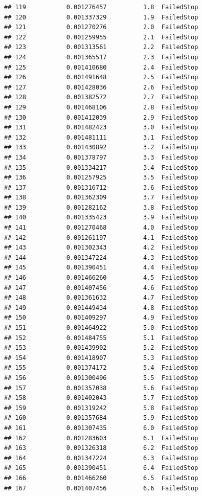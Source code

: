 \documentclass[
]{article}
\begin{document}
\begin{verbatim}
## 119           0.001276457          1.8  FailedStop
## 120           0.001337329          1.9  FailedStop
## 121           0.001270276          2.0  FailedStop
## 122           0.001259955          2.1  FailedStop
## 123           0.001313561          2.2  FailedStop
## 124           0.001365517          2.3  FailedStop
## 125           0.001410680          2.4  FailedStop
## 126           0.001491648          2.5  FailedStop
## 127           0.001428036          2.6  FailedStop
## 128           0.001382572          2.7  FailedStop
## 129           0.001468106          2.8  FailedStop
## 130           0.001412039          2.9  FailedStop
## 131           0.001482423          3.0  FailedStop
## 132           0.001481111          3.1  FailedStop
## 133           0.001430892          3.2  FailedStop
## 134           0.001378797          3.3  FailedStop
## 135           0.001334217          3.4  FailedStop
## 136           0.001257925          3.5  FailedStop
## 137           0.001316712          3.6  FailedStop
## 138           0.001362309          3.7  FailedStop
## 139           0.001282162          3.8  FailedStop
## 140           0.001335423          3.9  FailedStop
## 141           0.001270468          4.0  FailedStop
## 142           0.001261197          4.1  FailedStop
## 143           0.001302343          4.2  FailedStop
## 144           0.001347224          4.3  FailedStop
## 145           0.001390451          4.4  FailedStop
## 146           0.001466260          4.5  FailedStop
## 147           0.001407456          4.6  FailedStop
## 148           0.001361632          4.7  FailedStop
## 149           0.001449434          4.8  FailedStop
## 150           0.001409297          4.9  FailedStop
## 151           0.001464922          5.0  FailedStop
## 152           0.001484755          5.1  FailedStop
## 153           0.001439902          5.2  FailedStop
## 154           0.001418907          5.3  FailedStop
## 155           0.001374172          5.4  FailedStop
## 156           0.001300496          5.5  FailedStop
## 157           0.001357038          5.6  FailedStop
## 158           0.001402043          5.7  FailedStop
## 159           0.001319242          5.8  FailedStop
## 160           0.001357684          5.9  FailedStop
## 161           0.001307435          6.0  FailedStop
## 162           0.001283603          6.1  FailedStop
## 163           0.001326318          6.2  FailedStop
## 164           0.001347224          6.3  FailedStop
## 165           0.001390451          6.4  FailedStop
## 166           0.001466260          6.5  FailedStop
## 167           0.001407456          6.6  FailedStop

\end{verbatim}
\end{document}
